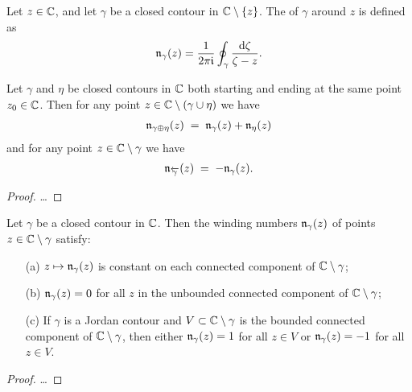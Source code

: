 \begin{definition}
  \label{def:winding_number}
  Let $z \in \mathbb{C}$, and let $\gamma$ be a closed contour
  in $\mathbb{C} \setminus \left\{ z \right\}$.
  The  of $\gamma$ around $z$ is defined as
  \begin{align*}
    \mathfrak{n}_{{\gamma}}(z) = \frac{1}{2\pi \mathfrak{i}} \oint_\gamma \frac{\mathrm{d} \zeta}{\zeta - z} .
  \end{align*}
\end{definition}

\begin{lemma}
  \label{lem:winding_additivity}
  Let $\gamma$ and $\eta$ be closed contours in $\mathbb{C}$
  both starting and ending at the same point $z_0 \in \mathbb{C}$.
  Then for any point $z \in \mathbb{C} \setminus (\gamma \cup \eta)$
  we have
  \begin{align*}
    \mathfrak{n}_{{\gamma \oplus \eta}}(z)
    \; = \; \mathfrak{n}_{{\gamma}}(z) + \mathfrak{n}_{{\eta}}(z)
  \end{align*}
  and for any point $z \in \mathbb{C} \setminus \gamma$ we have
  \begin{align*}
    \mathfrak{n}_{{\overleftarrow{\gamma}}}(z)
    \; = \; -\mathfrak{n}_{{\gamma}}(z) .
  \end{align*}
\end{lemma}
\begin{proof}
  \ldots
\end{proof}


\begin{lemma}
  \label{lem:winding_number_properties}
  Let $\gamma$ be a closed contour in $\mathbb{C}$. Then the winding
  numbers $\mathfrak{n}_{{\gamma}}(z)$ of points $z \in \mathbb{C} \setminus \gamma$
  satisfy:
  \begin{itemize}
    \item[(a)] $z \mapsto \mathfrak{n}_{{\gamma}}(z)$ is constant on
      each connected component of $\mathbb{C} \setminus \gamma$;
    \item[(b)] $\mathfrak{n}_{{\gamma}}(z) = 0$ for all $z$ in the
      unbounded connected component of $\mathbb{C} \setminus \gamma$;
    \item[(c)] If $\gamma$ is a Jordan contour and
      $V \subset \mathbb{C} \setminus \gamma$ is the bounded connected
      component of $\mathbb{C} \setminus \gamma$, then
      either $\mathfrak{n}_{{\gamma}}(z) = 1$ for all $z \in V$
      or $\mathfrak{n}_{{\gamma}}(z) = -1$ for all $z \in V$.
  \end{itemize}
\end{lemma}
\begin{proof}
  \ldots
\end{proof}

